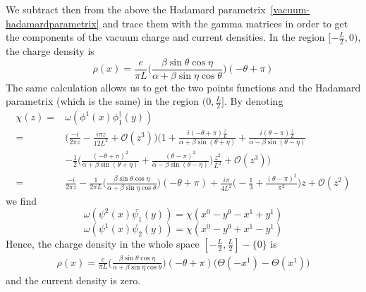 We subtract then from the above the Hadamard parametrix~\cref{vacuum-hadamardparametrix} and trace them with the gamma matrices in order to get the components of the vacuum charge and current densities.
In the region $[-\frac{L}{2}, 0)$, the charge density is
\begin{equation}
\rho(x) = \frac{e}{\pi L}\Big( \frac{\beta \sin \theta \cos \eta}{\alpha + \beta \sin \eta \cos \theta}\Big) (-\theta + \pi)
\end{equation}
The same calculation allows us to get the two points functions and the Hadamard parametrix (which is the same) in the region $(0, \frac{L}{2}]$. By denoting
\begin{equation*}
\begin{split} 
\chi(z) = & \omega(\phi^1(x) \phi^\dagger_1(y)) \\
= & \Big(  \frac{-i}{2 \pi z} - \frac{i \pi z}{12L^2} + \mathcal{O}(z^3) \Big)  \bigg( 1 + \frac{i(-\theta + \pi)\frac{z}{L}}{\alpha + \beta\sin(\theta + \eta)}  
+ \frac{ i (\theta - \pi) \frac{z}{L}}{\alpha - \beta\sin(\theta - \eta)}   \\
& - \frac{1}{2}\Big(\frac{(-\theta + \pi)^2}{\alpha + \beta \sin (\theta + \eta)}  
+ \frac{(\theta - \pi)^2}{\alpha - \beta \sin (\theta - \eta)} \Big)\frac{z^2}{L^2}
+ \mathcal{O}(z^3) \bigg)  \\
= & \frac{-i}{2 \pi z} - \frac{1}{2\pi L} \Big( \frac{\beta \sin \theta \cos \eta}{\alpha + \beta \sin \eta \cos \theta}\Big) (-\theta + \pi) 
+ \frac{i\pi}{4 L^2}\big( -\frac{1}{3} + \frac{(\theta - \pi)^2}{\pi^2}\big)z
+ \mathcal{O}(z^2)
\end{split}
\end{equation*}
we find
\begin{equation*}
\omega(\psi^2(x) \bar{\psi_1}(y)) = \chi(x^0 - y^0 - x^1 + y^1)
\end{equation*}
\begin{equation*}
\omega(\psi^1(x) \bar{\psi_2}(y)) = \chi(x^0 - y^0 + x^1 - y^1)
\end{equation*}
Hence, the charge density in the whole space $[-\frac{L}{2}, \frac{L}{2}] - \{0\}$ is
\begin{equation}\label{vacuum-density_without_field}
\begin{split}
\rho(x) = \frac{e}{\pi L}\Big( \frac{\beta \sin \theta \cos \eta}{\alpha + \beta \sin \eta \cos \theta}\Big) (-\theta + \pi) \Big( \Theta(-x^1) - \Theta(x^1)\Big)
\end{split}
\end{equation}
and the current density is zero. 
